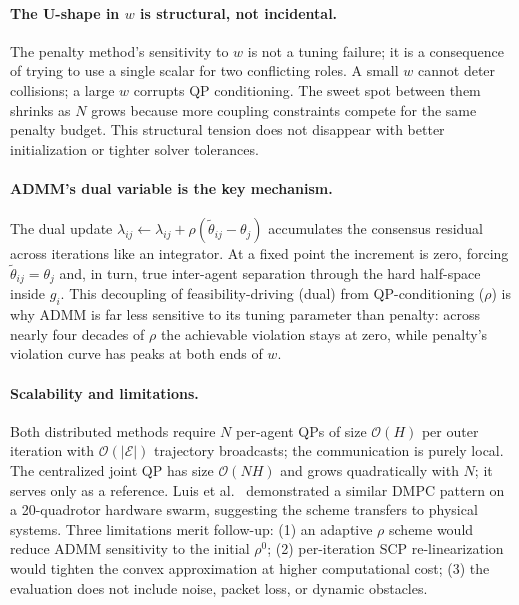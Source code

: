\documentclass[11pt,onecolumn]{article}
\begin{document}
\paragraph{The U-shape in $w$ is structural, not incidental.}
The penalty method's sensitivity to $w$ is not a tuning failure; it is a consequence of
trying to use a single scalar for two conflicting roles.  A small $w$ cannot deter
collisions; a large $w$ corrupts QP conditioning.  The sweet spot between them shrinks
as $N$ grows because more coupling constraints compete for the same penalty budget.
This structural tension does not disappear with better initialization or tighter solver
tolerances.

\paragraph{ADMM's dual variable is the key mechanism.}
The dual update
$\lambda_{ij} \leftarrow \lambda_{ij} + \rho(\tilde\theta_{ij} - \theta_j)$
accumulates the consensus residual across iterations like an integrator.  At a fixed
point the increment is zero, forcing $\tilde\theta_{ij} = \theta_j$ and, in turn, true
inter-agent separation through the hard half-space inside $g_i$.  This decoupling
of feasibility-driving (dual) from QP-conditioning ($\rho$) is why ADMM is far less
sensitive to its tuning parameter than penalty: across nearly four decades of $\rho$
the achievable violation stays at zero, while penalty's violation curve has peaks at
both ends of $w$.

\paragraph{Scalability and limitations.}
Both distributed methods require $N$ per-agent QPs of size $\mathcal{O}(H)$ per outer
iteration with $\mathcal{O}(|\mathcal{E}|)$ trajectory broadcasts; the communication is purely local.  The centralized joint QP has size $\mathcal{O}(NH)$ and grows
quadratically with $N$; it serves only as a reference.  Luis et al.\
\cite{luis2020online} demonstrated a similar DMPC pattern on a 20-quadrotor hardware
swarm, suggesting the scheme transfers to physical systems.  Three limitations merit
follow-up: (1) an adaptive $\rho$ scheme \cite{wohlberg2017,xu2017acadmm} would reduce
ADMM sensitivity to the initial $\rho^0$; (2) per-iteration SCP re-linearization would
tighten the convex approximation at higher computational cost; (3) the evaluation does
not include noise, packet loss, or dynamic obstacles.
\end{document}

